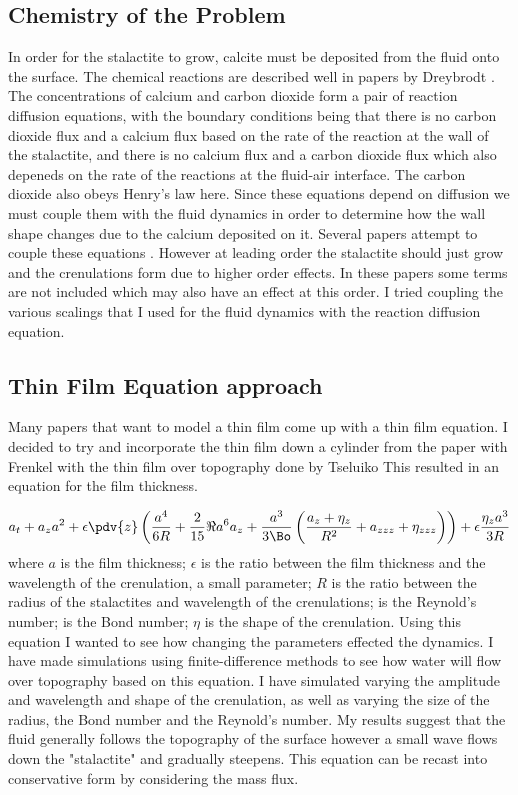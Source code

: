 \documentclass[12pt]{article}
\begin{document}
\subsection{Chemistry of the Problem}
In order for the stalactite to grow, calcite must be deposited from the fluid onto the surface. The chemical reactions are described well in papers by Dreybrodt \cite{formation}. The concentrations of calcium and carbon dioxide form a pair of  reaction diffusion equations, with the boundary conditions being that there is no carbon dioxide flux and a calcium flux based on the rate of the reaction at the wall of the stalactite, and there is no calcium flux and a carbon dioxide flux which also depeneds on the rate of the reactions at the fluid-air interface.  The carbon dioxide also obeys Henry's law here. Since these equations depend on diffusion we must couple them with the fluid dynamics in order to determine how the wall shape changes due to the calcium deposited on it.
Several papers attempt to couple these equations \cite{short,camporeale_2017}. However at leading order the stalactite should just grow and the crenulations form due to higher order effects. In these papers some terms are not included which may also have an effect at this order. I tried coupling the various scalings that I used for the fluid dynamics with the reaction diffusion equation.




\subsection{Thin Film Equation approach}
Many papers that want to model a thin film come up with a thin film equation. I decided to try and incorporate the thin film down a cylinder from the paper with Frenkel \cite{Frenkel_1992} with the thin film over topography done by Tseluiko \cite{tseluiko_blyth_papageorgiou_2013}
This resulted in an equation for the film thickness.

\begin{align}
a_t + a_z a^2  +\epsilon\pdv{z}\left(\frac{a^4}{6R}+\frac{2}{15}\Re a^6a_z+ \frac{a^3}{3\Bo}\left(\frac{a_z+\eta_z}{R^2}+a_{zzz}+\eta_{zzz}\right)\right) + \epsilon\frac{\eta_z a^3}{3R}\label{walldyn}
\end{align}
where $a$ is the film thickness; $\epsilon$ is the ratio between the film thickness and the wavelength of the crenulation, a small parameter; $R$ is the ratio between the radius of the stalactites and wavelength of the crenulations; is the Reynold's number;  is the Bond number; $\eta$ is the shape of the crenulation.
Using this equation I wanted to see how changing the parameters effected the dynamics. I have made simulations using finite-difference methods to see how water will flow over topography based on this equation. I have simulated varying the amplitude and wavelength and shape of the crenulation, as well as varying the size of the radius, the Bond number and the Reynold's number. My results suggest that the fluid generally follows the topography of the surface however a small wave flows down the "stalactite" and gradually steepens. This equation can be recast into conservative form by considering the mass flux. 
\end{document}
